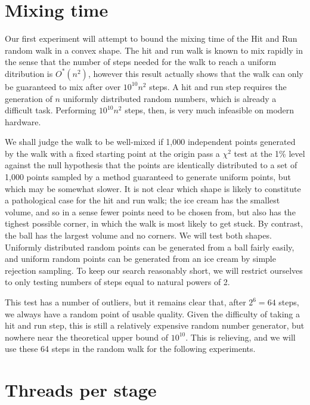 \section{Mixing time}\label{sec_mix}

Our first experiment will attempt to bound the mixing time of the Hit and Run random walk in a convex shape. The hit and run walk is known to mix rapidly %
in the sense that the number of steps needed for the walk to reach a uniform ditribution is $O^{*}(n^2)$, however this result actually shows that the walk can only be guaranteed to mix after over $10^{10} n^2$
steps. A hit and run step requires the generation of $n$ uniformly distributed random numbers, which is already a difficult task. Performing $10^{10} n^2$ steps, then, is very much infeasible on modern hardware.

We shall judge the walk to be well-mixed if 1,000 independent points generated by the walk with a fixed starting point at the origin pass a $\chi^2$ test at the 1\% level against the null hypothesis that the points are identically distributed to a set of 1,000 points sampled by a method guaranteed to generate uniform points, but which may be somewhat slower. It is not clear which shape is likely to constitute a pathological case for the hit and run walk; the ice cream has the smallest volume, and so in a sense fewer points need to be chosen from, but also has the tighest possible corner, in which the walk is most likely to get stuck. By contrast, the ball has the largest volume and no corners. We will test both shapes. Uniformly distributed random points can be generated from a ball fairly easily, and uniform random points can be generated from an ice cream by simple rejection sampling. To keep our search reasonably short,  we will restrict ourselves to only testing numbers of steps equal to natural powers of 2.


This test has a number of outliers, but it remains clear that, after $2^6 = 64$ steps, we always have a random point of usable quality. Given the difficulty of taking a hit and run step, this is still a relatively expensive random number generator, but nowhere near the theoretical upper bound of $10^10$. This is relieving, and we will use these 64 steps in the random walk for the following experiments.


\section{Threads per stage}\label{sec_error}

